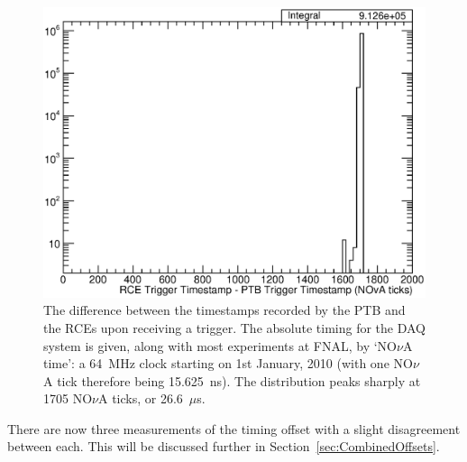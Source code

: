 \begin{figure}
  \centering
  \includegraphics[width=12cm]{PTBRCEDiffTimestamps.eps}
  \caption[The difference between the timestamps recorded by the PTB and the RCEs upon receiving a trigger.]{The difference between the timestamps recorded by the PTB and the RCEs upon receiving a trigger.  The absolute timing for the DAQ system is given, along with most experiments at FNAL, by `NO$\nu$A time': a 64~MHz clock starting on 1st January, 2010 (with one NO$\nu$A tick therefore being 15.625~ns).  The distribution peaks sharply at 1705 NO$\nu$A ticks, or 26.6~$\mu$s.}
  \label{fig:TPCCounterOffset}
\end{figure}

There are now three measurements of the timing offset with a slight disagreement between each.  This will be discussed further in Section~\ref{sec:CombinedOffsets}.


